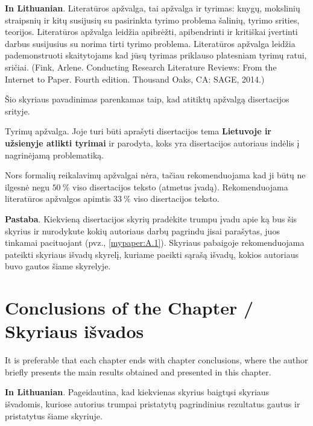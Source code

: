 \textbf{In Lithuanian}. Literatūros apžvalga, tai apžvalga ir tyrimas: knygų, mokslinių straipsnių ir kitų susijusių su pasirinkta tyrimo problema šalinių, tyrimo srities, teorijos. 
Literatūros apžvalga leidžia apibrėžti, apibendrinti ir kritiškai įvertinti darbus susijusius su norima tirti tyrimo problema.
Literatūros apžvalga leidžia pademonstruoti skaitytojams kad jūsų tyrimas priklauso platesniam tyrimų ratui, sričiai. (Fink, Arlene. Conducting Research Literature Reviews: From the Internet to Paper. Fourth edition. Thousand Oaks, CA: SAGE, 2014.) 


Šio skyriaus pavadinimas parenkamas taip, kad atitiktų apžvalgą disertacijos srityje.

Tyrimų apžvalga. Joje turi būti aprašyti disertacijos tema \textbf{Lietuvoje ir užsienyje atlikti tyrimai} ir parodyta, koks yra disertacijos autoriaus indėlis į nagrinėjamą problematiką.

Nors formalių reikalavimų apžvalgai nėra, tačiau rekomenduojama kad ji būtų ne ilgesnė negu $50\ \%$ viso disertacijos teksto (atmetus įvadą). Rekomenduojama literatūros apžvalgos apimtis $33\ \%$ viso disertacijos teksto.

\textbf{Pastaba}. Kiekvieną disertacijos skyrių pradėkite trumpu įvadu apie ką bus šis skyrius ir nurodykute kokių autoriaus darbų pagrindu jisai parašytas, juos tinkamai pacituojant (pvz., \ref{mypaper:A.1}). Skyriaus pabaigoje rekomenduojama pateikti skyriaus išvadų skyrelį, kuriame paeikti sąrašą išvadų, kokios autoriaus buvo gautos šiame skyrelyje.


\section{Conclusions of the Chapter / Skyriaus išvados}
It is preferable that each chapter ends with chapter conclusions, where the author briefly presents the main results obtained and presented in this chapter.

\textbf{In Lithuanian}. Pageidautina, kad kiekvienas skyrius baigtųsi skyriaus išvadomis, kuriose autorius trumpai pristatytų pagrindinius rezultatus gautus ir pristatytus šiame skyriuje.
